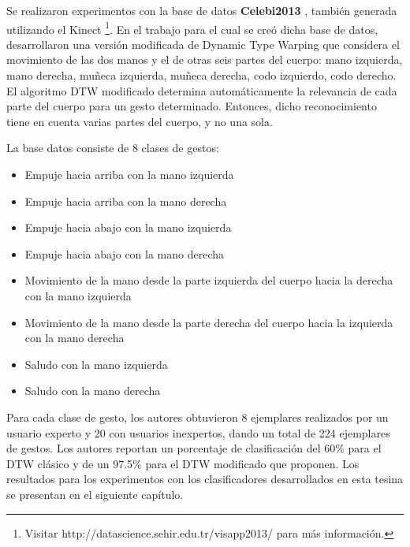 
Se realizaron experimentos con la base de datos \textbf{Celebi2013} \cite{celebi2013}, también generada utilizando el Kinect \footnote{Visitar http://datascience.sehir.edu.tr/visapp2013/ para más información.}. En el trabajo para el cual se creó dicha base de datos, desarrollaron una versión modificada de Dynamic Type Warping que considera el movimiento de las dos manos y el de otras seis partes del cuerpo: mano izquierda,  mano derecha, muñeca izquierda, muñeca derecha, codo izquierdo, codo derecho. El algoritmo DTW modificado determina automáticamente la relevancia de cada parte del cuerpo para un gesto determinado. Entonces, dicho reconocimiento tiene en cuenta varias partes del cuerpo, y no una sola. 

La base datos consiste de 8 clases de gestos:


\begin{itemize}
\item Empuje hacia arriba con la mano izquierda
\item Empuje hacia arriba con la mano derecha

\item Empuje hacia abajo con la mano izquierda
\item Empuje hacia abajo con la mano derecha

\item Movimiento de la mano desde la parte izquierda del cuerpo hacia la derecha con la mano izquierda
\item Movimiento de la mano desde la parte derecha del cuerpo hacia la izquierda con la mano derecha

\item Saludo con la mano izquierda
\item Saludo con la mano derecha
\end{itemize}


Para cada clase de gesto, los autores obtuvieron 8 ejemplares realizados por un usuario experto y 20 con usuarios inexpertos, dando un total de  224 ejemplares de gestos. Los autores reportan un porcentaje de clasificación del 60\% para el DTW clásico y de un 97.5\% para el DTW modificado que proponen. Los resultados para los experimentos con los clasificadores desarrollados en esta tesina se presentan en el siguiente capítulo.



